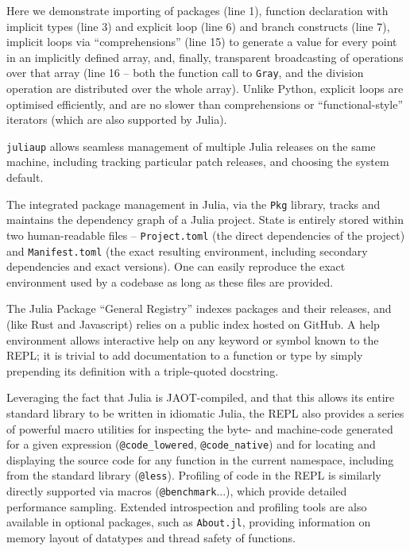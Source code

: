 \documentclass{webofc}
\begin{document}
Here we demonstrate importing of packages (line 1), function declaration with
implicit types (line 3) and explicit loop (line 6) and branch constructs (line
7), implicit loops via ``comprehensions'' (line 15) to generate a  value for
every point in an implicitly defined array, and, finally, transparent
broadcasting of operations over that array (line 16 -- both the function call to
\texttt{Gray}, and the division operation are distributed over the whole array). Unlike
Python, explicit loops are optimised efficiently, and are no slower than
comprehensions or ``functional-style'' iterators (which are also supported by
Julia).


\texttt{juliaup} allows seamless management of multiple Julia releases on the same
machine, including tracking particular patch releases, and choosing the system
default.

The integrated package management in Julia, via the \texttt{Pkg} library, tracks and
maintains the dependency graph of a Julia project. State is entirely stored
within two human-readable files -- \texttt{Project.toml} (the direct
dependencies of the project) and \texttt{Manifest.toml} (the exact
resulting environment, including secondary dependencies and exact versions).
One can easily reproduce the exact environment used by
a codebase as long as these files are provided.

The Julia Package ``General Registry'' indexes packages and their releases, and
(like Rust and Javascript) relies on a public index
hosted on GitHub. A help environment allows interactive help on any keyword
or symbol known to the REPL; it is trivial to add documentation to a function or
type by simply prepending its definition with a triple-quoted docstring.

Leveraging the fact that Julia is JAOT-compiled, and that this allows its entire
standard library to be written in idiomatic Julia, the REPL also provides a
series of powerful macro utilities for inspecting the byte- and machine-code
generated for a given expression (\verb$@code_lowered$, \verb$@code_native$) and
for locating and displaying the source code for any function in the current
namespace, including from the standard library (\verb$@less$). Profiling of code
in the REPL is similarly directly supported via macros (\verb$@benchmark$...),
which provide detailed performance sampling. Extended introspection and
profiling tools are also available in optional packages, such as
\texttt{About.jl}, providing information on memory layout of datatypes and
thread safety of functions.
\end{document}

